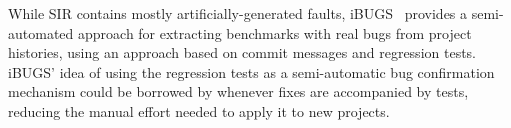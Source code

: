 While SIR contains mostly artificially-generated faults,
iBUGS~\cite{ibugs} provides a semi-automated approach for extracting
benchmarks with real bugs from project histories, using an approach
based on commit messages and regression tests. iBUGS' idea of using
the regression tests as a semi-automatic bug confirmation mechanism
could be borrowed by \covrig whenever fixes are accompanied by tests,
reducing the manual effort needed to apply it to new projects.






